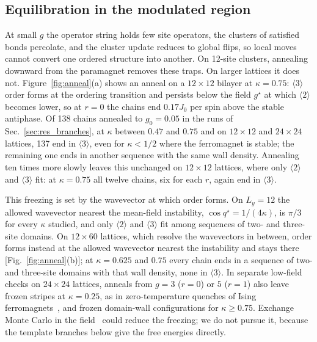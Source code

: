 \documentclass[
 aps,prb,
 twocolumn,
 superscriptaddress,
 longbibliography,
 nofootinbib,
 floatfix
]{revtex4-2}
\newcommand{\qs}{q^\star}
\begin{document}
\subsection{Equilibration in the modulated region}
\label{sec:branches}

At small $g$ the operator string holds few site operators, the clusters of satisfied bonds percolate, and the
cluster update reduces to global flips, so local moves cannot convert one ordered structure into another. On 12-site
clusters, annealing downward from the paramagnet removes these traps. On larger lattices it does not.
Figure~\ref{fig:anneal}(a) shows an anneal on a $12\times12$ bilayer at $\kappa=0.75$: $\langle3\rangle$ order forms at
the ordering transition and persists below the field $g^\star$ at which $\langle2\rangle$ becomes lower, so at $r=0$ the chains end
$0.17J_0$ per spin above the stable antiphase. Of 138 chains annealed to $g_0=0.05$ in the runs of
Sec.~\ref{sec:res_branches}, at $\kappa$ between $0.47$ and $0.75$ and on $12\times12$ and $24\times24$ lattices, 137 end in
$\langle3\rangle$, even for $\kappa<1/2$ where the ferromagnet is stable; the remaining one ends in another sequence with
the same wall density. Annealing ten times more slowly leaves this unchanged on $12\times12$ lattices, where only $\langle2\rangle$ and
$\langle3\rangle$ fit: at $\kappa=0.75$ all twelve chains, six for each $r$, again end in $\langle3\rangle$.

This freezing is set by the wavevector at which order forms. On $L_y=12$ the allowed wavevector nearest the mean-field
instability, $\cos\qs=1/(4\kappa)$, is $\pi/3$ for every $\kappa$ studied, and only $\langle2\rangle$ and $\langle3\rangle$ fit
among sequences of two- and three-site domains. On $12\times60$ lattices, which resolve the wavevectors in between, order
forms instead at the allowed wavevector nearest the instability and stays there [Fig.~\ref{fig:anneal}(b)]; at
$\kappa=0.625$ and $0.75$ every chain ends in a sequence of two- and three-site domains with that wall density, none in
$\langle3\rangle$. In
separate low-field checks on $24\times24$ lattices, anneals from $g=3$ ($r=0$) or $5$ ($r=1$) also leave frozen stripes at
$\kappa=0.25$, as in zero-temperature quenches of Ising ferromagnets~\cite{spirin2001fate}, and frozen domain-wall
configurations for $\kappa\ge0.75$. Exchange Monte Carlo
in the field~\cite{hukushima1996exchange} could reduce the freezing; we do not pursue it, because the template branches
below give the free energies directly.
\end{document}
